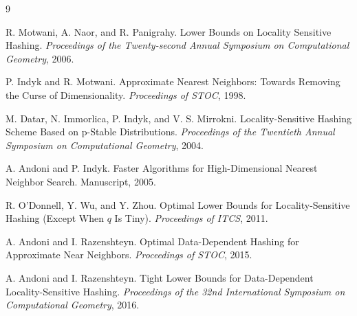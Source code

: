 \documentclass[UTF8,11pt,a4paper]{ctexart}
\begin{document}
\begin{thebibliography}{9}

R. Motwani, A. Naor, and R. Panigrahy.
\newblock Lower Bounds on Locality Sensitive Hashing.
\newblock \emph{Proceedings of the Twenty-second Annual Symposium on Computational Geometry}, 2006.

P. Indyk and R. Motwani.
\newblock Approximate Nearest Neighbors: Towards Removing the Curse of Dimensionality.
\newblock \emph{Proceedings of STOC}, 1998.

M. Datar, N. Immorlica, P. Indyk, and V. S. Mirrokni.
\newblock Locality-Sensitive Hashing Scheme Based on p-Stable Distributions.
\newblock \emph{Proceedings of the Twentieth Annual Symposium on Computational Geometry}, 2004.

A. Andoni and P. Indyk.
\newblock Faster Algorithms for High-Dimensional Nearest Neighbor Search.
\newblock Manuscript, 2005.

R. O'Donnell, Y. Wu, and Y. Zhou.
\newblock Optimal Lower Bounds for Locality-Sensitive Hashing (Except When $q$ Is Tiny).
\newblock \emph{Proceedings of ITCS}, 2011.

A. Andoni and I. Razenshteyn.
\newblock Optimal Data-Dependent Hashing for Approximate Near Neighbors.
\newblock \emph{Proceedings of STOC}, 2015.

A. Andoni and I. Razenshteyn.
\newblock Tight Lower Bounds for Data-Dependent Locality-Sensitive Hashing.
\newblock \emph{Proceedings of the 32nd International Symposium on Computational Geometry}, 2016.

\end{thebibliography}
\end{document}
